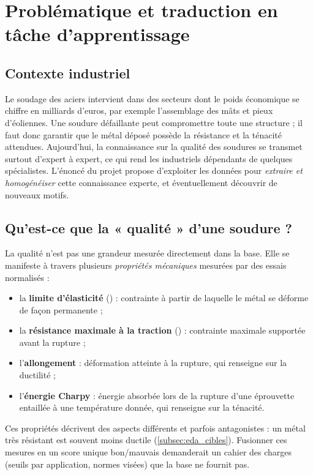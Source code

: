 \clearpage
\section{Problématique et traduction en tâche d'apprentissage}
\label{sec:intro}

\subsection{Contexte industriel}

Le soudage des aciers intervient dans des secteurs dont le poids économique se
chiffre en milliards d'euros, par exemple l'assemblage des mâts et pieux
d'éoliennes. Une soudure défaillante peut compromettre toute une structure ;
il faut donc garantir que le métal déposé possède la résistance et la ténacité
attendues. Aujourd'hui, la connaissance sur la qualité des soudures se transmet
surtout d'expert à expert, ce qui rend les industriels dépendants de quelques
spécialistes. L'énoncé du projet propose d'exploiter les données pour
\emph{extraire et homogénéiser} cette connaissance experte, et éventuellement
découvrir de nouveaux motifs.

\subsection{Qu'est-ce que la « qualité » d'une soudure ?}

La qualité n'est pas une grandeur mesurée directement dans la base. Elle se
manifeste à travers plusieurs \emph{propriétés mécaniques} mesurées par des
essais normalisés :
\begin{itemize}
  \item la \textbf{limite d'élasticité} (\YS) : contrainte à partir de laquelle le métal se déforme de façon permanente ;
  \item la \textbf{résistance maximale à la traction} (\UTS) : contrainte maximale supportée avant la rupture ;
  \item l'\textbf{allongement} : déformation atteinte à la rupture, qui renseigne sur la ductilité ;
  \item l'\textbf{énergie Charpy} : énergie absorbée lors de la rupture d'une éprouvette entaillée à une température donnée, qui renseigne sur la ténacité.
\end{itemize}
Ces propriétés décrivent des aspects différents et parfois antagonistes : un
métal très résistant est souvent moins ductile (\cref{subsec:eda_cibles}).
Fusionner ces mesures en un score unique \og bon/mauvais \fg{} demanderait un
cahier des charges (seuils par application, normes visées) que la base ne fournit
pas.

